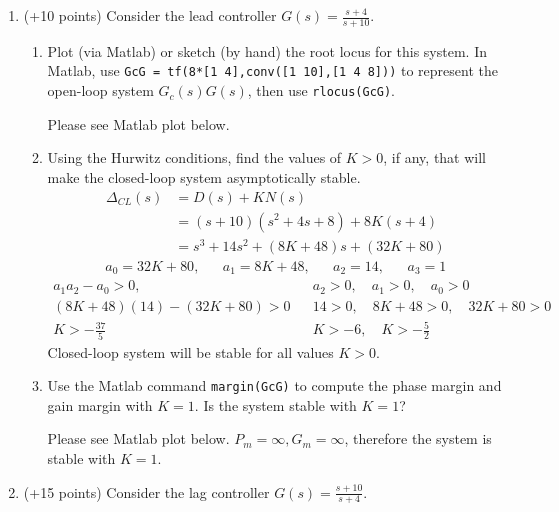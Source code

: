 \documentclass[11pt]{article}
\begin{document}
\begin{enumerate}
    \item (+10 points) Consider the lead controller \( G(s)=\displaystyle\frac{s+4}{s+10} \).
        \begin{enumerate}
            \item Plot (via Matlab) or sketch (by hand) the root locus for this system. In Matlab, use \texttt{GcG = tf(8*[1 4],conv([1 10],[1 4 8]))} to represent the open-loop system \(G_c(s)G(s)\), then use \texttt{rlocus(GcG)}.\par
                \color{CrispBlue}
                Please see Matlab plot below.
                \color{black}
            \item Using the Hurwitz conditions, find the values of \(K >0\), if any, that will make the closed-loop system asymptotically stable.
                \color{CrispBlue}
                \begin{align*}
                    \Delta_{CL}(s) &= D(s) + K N(s)\\
                    &= (s+10)(s^2+4s+8)+8K(s+4)\\
                    &=s^3+14s^2+(8K+48)s+(32K+80)
                \end{align*}
                \begin{align*}
                    a_0=32K+80, && a_1=8K+48, && a_2=14, && a_3=1
                \end{align*}
                \begin{align*}
                    a_1a_2-a_0>0, && a_2>0,\quad a_1>0,\quad a_0>0\\
                    (8K+48)(14)-(32K+80)>0 && 14>0,\quad 8K+48>0,\quad 32K+80>0\\
                    K>-\frac{37}{5} && K>-6,\quad K>-\frac{5}{2}
                \end{align*}
                Closed-loop system will be stable for all values \(K>0\).
                \color{black}
            \item Use the Matlab command \texttt{margin(GcG)} to compute the phase margin and gain margin with \(K= 1\). Is the system stable with \(K= 1\)?\par
            \color{CrispBlue}
            Please see Matlab plot below. \(P_m = \infty, G_m = \infty\), therefore the system is stable with \(K= 1\).
            \color{black}
        \end{enumerate}
    \item (+15 points) Consider the lag controller \( G(s)=\displaystyle\frac{s+10}{s+4} \).

\end{enumerate}
\end{document}

